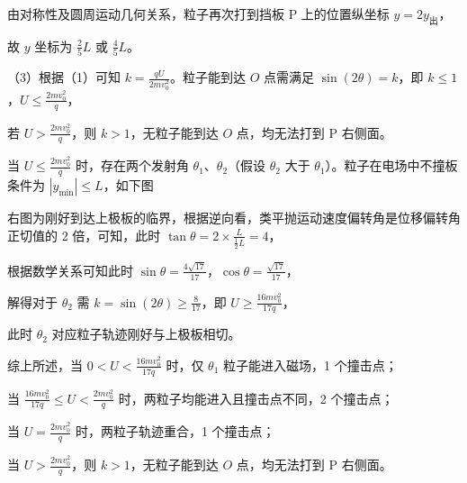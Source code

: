\documentclass[\gkver]{gaokaozhenti}
\begin{document}
\begin{enumerate}
{由对称性及圆周运动几何关系，粒子再次打到挡板 P 上的位置纵坐标 $y=2y_{\text{出}}$，

故 $y$ 坐标为 $\frac{2}{5}L$ 或 $\frac{4}{5}L$。

（3）根据（1）可知 $k=\frac{qU}{2mv_{0}^{2}}$。粒子能到达 $O$ 点需满足 $\sin(2\theta)=k$，即 $k\leq1$，$U\leq\frac{2mv_{0}^{2}}{q}$，

若 $U>\frac{2mv_{0}^{2}}{q}$，则 $k>1$，无粒子能到达 $O$ 点，均无法打到 P 右侧面。

当 $U\leq\frac{2mv_{0}^{2}}{q}$ 时，存在两个发射角 $\theta_{1}$、$\theta_{2}$（假设 $\theta_{2}$ 大于 $\theta_{1}$）。粒子在电场中不撞板条件为 $|y_{\min}|\leq L$，如下图


右图为刚好到达上极板的临界，根据逆向看，类平抛运动速度偏转角是位移偏转角正切值的 2 倍，可知，此时 $\tan\theta=2\times\frac{L}{\frac{1}{2}L}=4$，

根据数学关系可知此时 $\sin\theta=\frac{4\sqrt{17}}{17}$，$\cos\theta=\frac{\sqrt{17}}{17}$，

解得对于 $\theta_{2}$ 需 $k=\sin(2\theta)\geq\frac{8}{17}$，即 $U\geq\frac{16mv_{0}^{2}}{17q}$，

此时 $\theta_{2}$ 对应粒子轨迹刚好与上极板相切。

综上所述，当 $0<U<\frac{16mv_{0}^{2}}{17q}$ 时，仅 $\theta_{1}$ 粒子能进入磁场，1 个撞击点；

当 $\frac{16mv_{0}^{2}}{17q}\leq U<\frac{2mv_{0}^{2}}{q}$ 时，两粒子均能进入且撞击点不同，2 个撞击点；

当 $U=\frac{2mv_{0}^{2}}{q}$ 时，两粒子轨迹重合，1 个撞击点；

当 $U>\frac{2mv_{0}^{2}}{q}$，则 $k>1$，无粒子能到达 $O$ 点，均无法打到 P 右侧面。
}

\end{enumerate}
\end{document}
